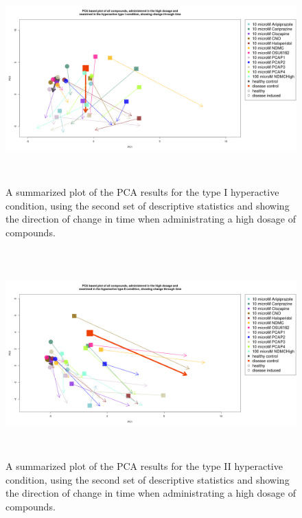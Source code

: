 \documentclass[a4paper,12pt]{article}
\begin{document}
\newpage
\begin{figure}[h!]
\begin{center}
\includegraphics[width=16cm,height=8cm]{All_together_10_microM_DarkApoHigh_in_time_set2.png}
\caption{A summarized plot of the PCA results for the type I hyperactive condition, using the second set of descriptive statistics and showing the direction of change in time when administrating a high dosage of compounds.}
\end{center}
\end{figure}
\newpage
\begin{figure}[h!]
\begin{center}
\includegraphics[width=16cm,height=8cm]{All_together_10_microM_DarkPTZ_in_time_set2.png}
\caption{A summarized plot of the PCA results for the type II hyperactive condition, using the second set of descriptive statistics and showing the direction of change in time when administrating a high dosage of compounds.}
\end{center}
\end{figure}
\end{document}
